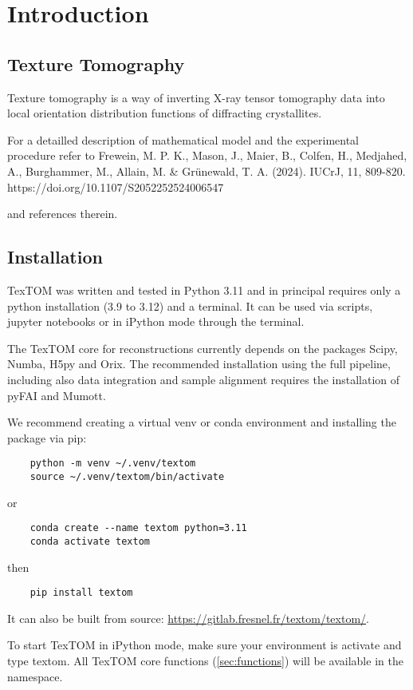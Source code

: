 \section{Introduction}

\subsection{Texture Tomography}
Texture tomography is a way of inverting X-ray tensor tomography data into local
orientation distribution functions of diffracting crystallites.

For a detailled description of mathematical model and the experimental procedure
refer to 
Frewein, M. P. K., Mason, J., Maier, B., Colfen, H., Medjahed, A., Burghammer, 
M., Allain, M. \& Grünewald, T. A. (2024). IUCrJ, 11, 809-820. https://doi.org/10.1107/S2052252524006547

and references therein.

\subsection{Installation}

TexTOM was written and tested in Python 3.11 and in principal requires only a python installation (3.9 to 3.12) and a terminal.
It can be used via scripts, jupyter notebooks or in iPython mode through the terminal.

The TexTOM core for reconstructions currently depends on the packages Scipy, Numba, H5py and Orix.
The recommended installation using the full pipeline, including also data integration and sample alignment requires the installation of pyFAI and Mumott.

We recommend creating a virtual venv or conda environment and installing the package via pip:

\begin{verbatim}
    python -m venv ~/.venv/textom
    source ~/.venv/textom/bin/activate
\end{verbatim}
or
\begin{verbatim}
    conda create --name textom python=3.11
    conda activate textom
\end{verbatim}
then
\begin{verbatim}
    pip install textom
\end{verbatim}

It can also be built from source: 
\url{https://gitlab.fresnel.fr/textom/textom/}.

To start TexTOM in iPython mode, make sure your environment is activate and type textom.
All TexTOM core functions (\ref{sec:functions}) will be available in the namespace.

